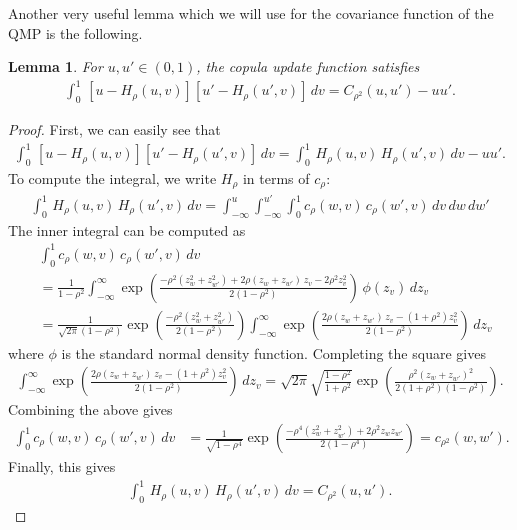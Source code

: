 \documentclass[11pt,a4paper]{article}
\newtheorem{lem}{Lemma}
\begin{document}
\begin{appendices}
Another very useful lemma which we will use for the covariance function of the QMP is the following.
\begin{lem}\label{app:lem_covariance}
For $u,u' \in (0,1)$, the copula update function satisfies
\begin{align*}
    \int_0^1\, \left[u - H_\rho(u,v)\right]\left[u' - H_\rho(u',v)\right]\, dv = C_{\rho^2}(u,u') - uu'.
\end{align*}
\end{lem}
\begin{proof}
    First, we can easily see that
    \begin{align*}
    \int_0^1\, \left[u - H_\rho(u,v)\right]\left[u' - H_\rho(u',v)\right]\, dv =  \int_0^1\, H_\rho(u,v)\,H_\rho(u',v)\, dv - uu'.
\end{align*}
To compute the integral, we write $H_\rho$ in terms of $c_\rho$:
\begin{align*}
    \int_0^1\, H_\rho(u,v)\,H_\rho(u',v)\, dv  =\int_{-\infty}^u \int_{-\infty}^{u'} \int_0^1 c_\rho(w,v)\, c_\rho(w',v)\, dv\, dw \, dw'
\end{align*}
The inner integral can be computed as
\begin{align*}
&\int_0^1 c_\rho(w,v)\, c_\rho(w',v)\, dv \\&= \frac{1}{1-\rho^2}\int_{-\infty}^\infty \exp\left(\frac{-\rho^2(z_w^2 + z_{w'}^2) + 2\rho (z_w + z_{w'})\, z_v - 2\rho^2 z_v^2}{2(1-\rho^2)}\right)\, \phi(z_v)\, dz_v\\
 &= \frac{1}{\sqrt{2\pi}(1-\rho^2)}\exp\left(\frac{-\rho^2(z_w^2 + z_{w'}^2)}{2(1-\rho^2)}\right)\int_{-\infty}^\infty \exp\left(\frac{2\rho (z_w + z_{w'})\, z_v - (1+\rho^2) z_v^2}{2(1-\rho^2)}\right)\, dz_v
\end{align*}
where $\phi$ is the standard normal density function. Completing the square gives
\begin{align*}
\int_{-\infty}^\infty \exp\left(\frac{2\rho (z_w + z_{w'})\, z_v - (1+\rho^2) z_v^2}{2(1-\rho^2)}\right)\, dz_v = \sqrt{2\pi}\sqrt{\frac{1-\rho^2}{1+\rho^2}}\exp\left(\frac{\rho^2\left(z_w + z_{w'}\right)^2}{2(1+\rho^2)(1-\rho^2)}\right).
\end{align*}
Combining the above gives
\begin{align*}
    \int_0^1 c_\rho(w,v)\, c_\rho(w',v)\, dv &= \frac{1}{\sqrt{1-\rho^4}}\exp\left(\frac{-\rho^4\left(z_{w}^2 + z_{w'}^2\right)+ 2\rho^2 z_{w}z_{w'}}{2(1-\rho^4)}\right) = c_{\rho^2}(w,w').
\end{align*}
Finally, this gives
\begin{align*}
     \int_0^1\, H_\rho(u,v)\,H_\rho(u',v)\, dv  =C_{\rho^2}(u,u').
\end{align*}
\end{proof}


\end{appendices}
\end{document}
